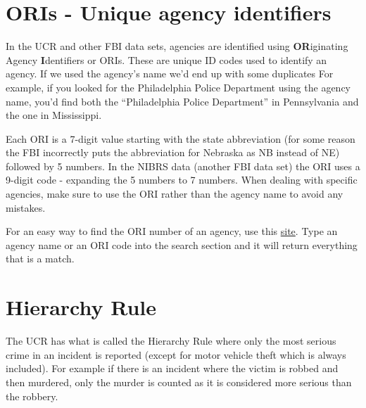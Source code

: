 \documentclass[
  12pt,
]{book}
\newenvironment{Shaded}{\begin{snugshade}}{\end{snugshade}}
\newcommand{\CommentTok}[1]{\textcolor[rgb]{0.56,0.35,0.01}{\textit{#1}}}
\newcommand{\DecValTok}[1]{\textcolor[rgb]{0.00,0.00,0.81}{#1}}
\newcommand{\KeywordTok}[1]{\textcolor[rgb]{0.13,0.29,0.53}{\textbf{#1}}}
\newcommand{\NormalTok}[1]{#1}
\newcommand{\OperatorTok}[1]{\textcolor[rgb]{0.81,0.36,0.00}{\textbf{#1}}}
\begin{document}
\hypertarget{oris---unique-agency-identifiers}{%
\section{ORIs - Unique agency identifiers}\label{oris---unique-agency-identifiers}}

In the UCR and other FBI data sets, agencies are identified using \textbf{OR}iginating Agency \textbf{I}dentifiers or ORIs. These are unique ID codes used to identify an agency. If we used the agency's name we'd end up with some duplicates For example, if you looked for the Philadelphia Police Department using the agency name, you'd find both the ``Philadelphia Police Department'' in Pennsylvania and the one in Mississippi.

\begin{Shaded}
\end{Shaded}

Each ORI is a 7-digit value starting with the state abbreviation (for some reason the FBI incorrectly puts the abbreviation for Nebraska as NB instead of NE) followed by 5 numbers. In the NIBRS data (another FBI data set) the ORI uses a 9-digit code - expanding the 5 numbers to 7 numbers. When dealing with specific agencies, make sure to use the ORI rather than the agency name to avoid any mistakes.

For an easy way to find the ORI number of an agency, use this \href{http://crimedatatool.com/crosswalk.html}{site}. Type an agency name or an ORI code into the search section and it will return everything that is a match.

\hypertarget{hierarchy-rule}{%
\section{Hierarchy Rule}\label{hierarchy-rule}}

The UCR has what is called the Hierarchy Rule where only the most serious crime in an incident is reported (except for motor vehicle theft which is always included). For example if there is an incident where the victim is robbed and then murdered, only the murder is counted as it is considered more serious than the robbery.
\end{document}
